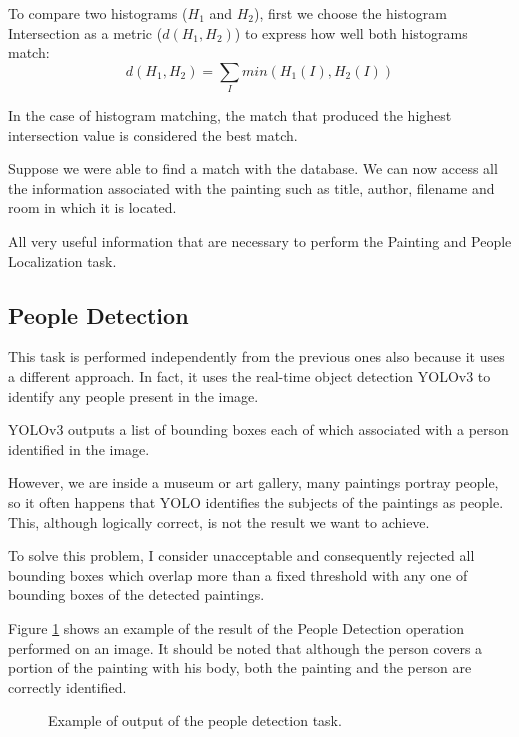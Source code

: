 \documentclass[10pt,twocolumn,letterpaper]{article}
\begin{document}
To compare two histograms ($H_1$ and $H_2$), first we choose the histogram Intersection as a metric ($d(H_1, H_2)$) to express how well both histograms match:
\begin{equation}
   d(H_1, H_2) = \sum_{I} min(H_1(I), H_2(I))
   \label{eq:5}
\end{equation}

In the case of histogram matching, the match that produced the highest intersection value is considered the best match.

Suppose we were able to find a match with the database. We can now access all the information associated with the painting such as title, author, filename and room in which it is located.

All very useful information that are necessary to perform the Painting and People Localization task.

\subsection{People Detection}

This task is performed independently from the previous ones also because it uses a different approach. In fact, it uses the real-time object detection YOLOv3 to identify any people present in the image.

YOLOv3 outputs a list of bounding boxes each of which associated with a person identified in the image.

However, we are inside a museum or art gallery, many paintings portray people, so it often happens that YOLO identifies the subjects of the paintings as people. This, although logically correct, is not the result we want to achieve.

To solve this problem, I consider unacceptable and consequently rejected all bounding boxes which overlap more than a fixed threshold with any one of bounding boxes of the detected paintings.

Figure \ref{fig:peopleDetection} shows an example of the result of the People Detection operation performed on an image. It should be noted that although the person covers a portion of the painting with his body, both the painting and the person are correctly identified.

\begin{figure}[t]
   \begin{center}
   \fbox{\rule{0pt}{2in} \rule{0.9\linewidth}{0pt}}
   \end{center}
      \caption{Example of output of the people detection task.}
   \label{fig:peopleDetection}
\end{figure}
\end{document}
